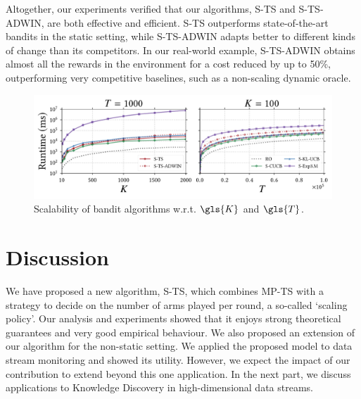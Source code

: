 Altogether, our experiments verified that our algorithms, \gls{S-TS} and \gls{S-TS-ADWIN}, are both effective and efficient. \gls{S-TS} outperforms state-of-the-art bandits in the static setting, while \gls{S-TS-ADWIN} adapts better to different kinds of change than its competitors. In our real-world example, \gls{S-TS-ADWIN} obtains almost all the rewards in the environment for a cost reduced by up to 50\%, outperforming very competitive baselines, such as a non-scaling dynamic oracle. 

\begin{figure}
	\centering
	\includegraphics[width=0.9\linewidth]{part3-figures/scalability_decision_time-2-compressed.pdf}
	\caption{Scalability of bandit algorithms w.r.t. $\gls{K}$ and $\gls{T}$.} 
	\label{real_world_scalability}
\end{figure} 

\section{Discussion}
\label{conclusion}

We have proposed a new algorithm, \gls{S-TS}, which combines \acrfull{MP-TS} with a strategy to decide on the number of arms played per round, a so-called `scaling policy'.
Our analysis and experiments showed that it enjoys strong theoretical guarantees and very good empirical behaviour. 
We also proposed an extension of our algorithm for the non-static setting.
We applied the proposed model to data stream monitoring and showed its utility. However, we expect the impact of our contribution to extend beyond this one application. In the next part, we discuss applications to Knowledge Discovery in high-dimensional data streams. 